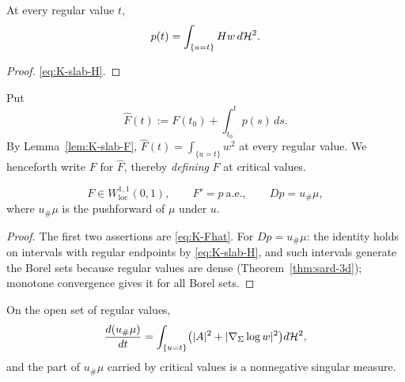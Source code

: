 \begin{lemma}\label{lem:K-p-geometric}
At every regular value $t$,
\begin{equation}\label{eq:K-p-geometric}
  p(t)=\int_{\{u=t\}}Hw\,d\mathcal H^2 .
\end{equation}
\end{lemma}

\begin{proof}
\eqref{eq:K-slab-H}.
\end{proof}

\begin{definition}\label{def:K-Fhat}
Put
\begin{equation}\label{eq:K-Fhat}
  \widehat F(t):=F(t_0)+\int_{t_0}^tp(s)\,ds .
\end{equation}
By Lemma~\ref{lem:K-slab-F}, $\widehat F(t)=\int_{\{u=t\}}w^2$ at every
regular value.  We henceforth write $F$ for $\widehat F$, thereby
\emph{defining} $F$ at critical values.
\end{definition}

\begin{proposition}\label{prop:K-structure}
\begin{equation}\label{eq:K-structure}
  F\in W^{1,1}_{\mathrm{loc}}(0,1),
  \qquad
  F'=p\ \text{a.e.},
  \qquad
  Dp=u_\#\mu ,
\end{equation}
where $u_\#\mu$ is the pushforward of $\mu$ under $u$.
\end{proposition}

\begin{proof}
The first two assertions are \eqref{eq:K-Fhat}.  For $Dp=u_\#\mu$: the
identity holds on intervals with regular endpoints by
\eqref{eq:K-slab-H}, and such intervals generate the Borel sets because
regular values are dense (Theorem~\ref{thm:sard-3d}); monotone convergence
gives it for all Borel sets.
\end{proof}

\begin{lemma}\label{lem:K-pushforward-density}
On the open set of regular values,
\begin{equation}\label{eq:K-pushforward-density}
  \frac{d(u_\#\mu)}{dt}
  =\int_{\{u=t\}}\bigl(|A|^2+|\nabla_\Sigma\log w|^2\bigr)d\mathcal H^2 ,
\end{equation}
and the part of $u_\#\mu$ carried by critical values is a nonnegative singular
measure.
\end{lemma}

